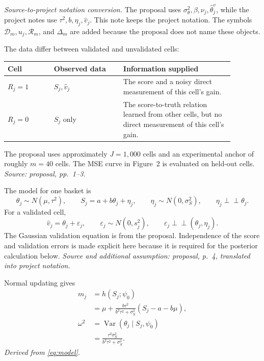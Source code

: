 \documentclass[11pt]{article}
\newcommand{\Var}{\operatorname{Var}}
\newcommand{\indep}{\mathrel{\perp\!\!\!\perp}}
\begin{document}
\noindent\textit{Source-to-project notation conversion.}
The proposal uses \(\sigma_\theta^2,\beta,\nu_j,\widehat\theta_j^v\), while
the project notes use \(\tau^2,b,\eta_j,\widehat v_j\). This note keeps the
project notation. The symbols \(\mathcal D_m,u_j,\mathcal R_m\), and
\(\Delta_m\) are added because the proposal does not name these objects.

The data differ between validated and unvalidated cells:
\begin{center}
\begin{tabular}{p{0.18\linewidth}p{0.27\linewidth}p{0.43\linewidth}}
\hline
Cell & Observed data & Information supplied \\
\hline
\(R_j=1\) & \(S_j,\widehat v_j\) & The score and a noisy direct measurement
of this cell's gain. \\
\(R_j=0\) & \(S_j\) only & The score-to-truth relation learned from other
cells, but no direct measurement of this cell's gain. \\
\hline
\end{tabular}
\end{center}
The proposal uses approximately \(J=1{,}000\) cells and an experimental
anchor of roughly \(m=40\) cells. The MSE curve in Figure~2 is evaluated on
held-out cells. \emph{Source: proposal, pp.~1--3.}

The model for one basket is
\begin{equation}
 \theta_j\sim N(\mu,\tau^2),
 \qquad
 S_j=a+b\theta_j+\eta_j,
 \qquad
 \eta_j\sim N(0,\sigma_S^2),
 \qquad
 \eta_j\indep\theta_j.
 \label{eq:model}
\end{equation}
For a validated cell,
\begin{equation}
 \widehat v_j=\theta_j+\varepsilon_j,
 \qquad
 \varepsilon_j\sim N(0,s_j^2),
 \qquad
 \varepsilon_j\indep(\theta_j,\eta_j).
 \label{eq:validation}
\end{equation}
The Gaussian validation equation is from the proposal. Independence of the
score and validation errors is made explicit here because it is required for
the posterior calculation below. \emph{Source and additional assumption:
proposal, p.~4, translated into project notation.}

Normal updating gives
\begin{align}
 m_j
 &=h(S_j;\psi_0) \\
 &=\mu+
 \frac{b\tau^2}{b^2\tau^2+\sigma_S^2}
 (S_j-a-b\mu),
 \label{eq:oracle-mean}\\
 \omega^2
 &=\Var(\theta_j\mid S_j,\psi_0) \\
 &=\frac{\tau^2\sigma_S^2}{b^2\tau^2+\sigma_S^2}.
 \label{eq:oracle-variance}
\end{align}
\emph{Derived from \eqref{eq:model}.}
\end{document}
